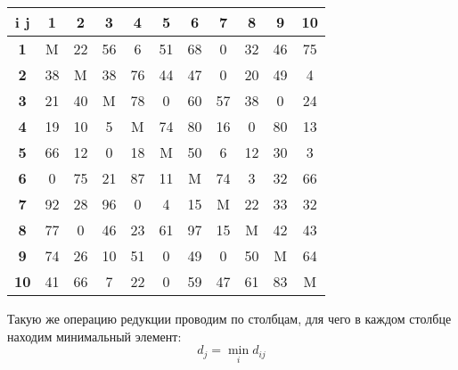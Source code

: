 \documentclass[17pt]{extarticle}
\begin{document}
\begin{table}[H]
    \centering
    \begin{tabular}{|c|c|c|c|c|c|c|c|c|c|c|}
        \hline
        \textbf{i j} & \textbf{1} & \textbf{2} & \textbf{3} & \textbf{4} & \textbf{5} & \textbf{6} & \textbf{7} & \textbf{8} & \textbf{9} & \textbf{10} \\ \hline
        \textbf{1}   & M          & 22         & 56         & 6          & 51         & 68         & 0          & 32         & 46         & 75          \\ \hline
        \textbf{2}   & 38         & M          & 38         & 76         & 44         & 47         & 0          & 20         & 49         & 4           \\ \hline
        \textbf{3}   & 21         & 40         & M          & 78         & 0          & 60         & 57         & 38         & 0          & 24          \\ \hline
        \textbf{4}   & 19         & 10         & 5          & M          & 74         & 80         & 16         & 0          & 80         & 13          \\ \hline
        \textbf{5}   & 66         & 12         & 0          & 18         & M          & 50         & 6          & 12         & 30         & 3           \\ \hline
        \textbf{6}   & 0          & 75         & 21         & 87         & 11         & M          & 74         & 3          & 32         & 66          \\ \hline
        \textbf{7}   & 92         & 28         & 96         & 0          & 4          & 15         & M          & 22         & 33         & 32          \\ \hline
        \textbf{8}   & 77         & 0          & 46         & 23         & 61         & 97         & 15         & M          & 42         & 43          \\ \hline
        \textbf{9}   & 74         & 26         & 10         & 51         & 0          & 49         & 0          & 50         & M          & 64          \\ \hline
        \textbf{10}  & 41         & 66         & 7          & 22         & 0          & 59         & 47         & 61         & 83         & M           \\ \hline
    \end{tabular}
\end{table}

Такую же операцию редукции проводим по столбцам, для чего в каждом столбце находим минимальный элемент:
\[ d_j = \min_i d_{ij} \]
\end{document}
